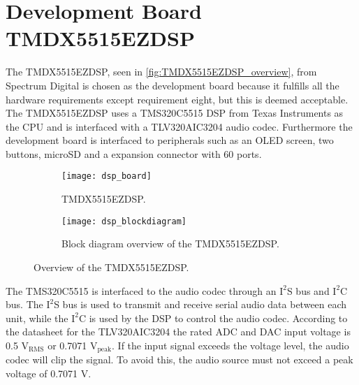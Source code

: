 \section{Development Board TMDX5515EZDSP}

The TMDX5515EZDSP, seen in \autoref{fig:TMDX5515EZDSP_overview}, from Spectrum Digital is chosen as the development board because it fulfills all the hardware requirements except requirement eight, but this is deemed acceptable.  The TMDX5515EZDSP uses a TMS320C5515 DSP from Texas Instruments as the CPU and is interfaced with a TLV320AIC3204 audio codec. Furthermore the development board is interfaced to peripherals such as an OLED screen, two buttons, microSD and a expansion connector with 60 ports. 

\begin{figure}[H]
\centering
\begin{subfigure}[t]{0.47\textwidth}
\texttt{[image: dsp\_board]}
	\caption{TMDX5515EZDSP.}
	\label{fig:TMDX5515EZDSP}
\end{subfigure}
\hspace{6mm} 
\begin{subfigure}[t]{0.35\textwidth}
\texttt{[image: dsp\_blockdiagram]}
	\caption{Block diagram overview of the TMDX5515EZDSP.}
	\label{fig:TMDX5515EZDSP_blockdiagram}
\end{subfigure}
\caption{Overview of the TMDX5515EZDSP.}
\label{fig:TMDX5515EZDSP_overview}
\end{figure}

The TMS320C5515 is interfaced to the audio codec through an $\text{I}^2$S bus and $\text{I}^2$C bus. The $\text{I}^2$S bus is used to transmit and receive serial audio data between each unit, while the $\text{I}^2$C is used by the DSP to control the audio codec. According to the datasheet for the TLV320AIC3204 the rated ADC and DAC input voltage is 0.5 $\text{V}_\text{RMS}$ or 0.7071 $\text{V}_\text{peak}$. If the input signal exceeds the voltage level, the audio codec will clip the signal. To avoid this, the audio source must not exceed a peak voltage of 0.7071 V.
















